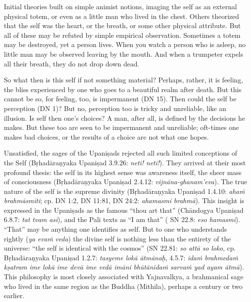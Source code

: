 \documentclass[12pt,openany]{book}%
\begin{document}
Initial theories built on simple animist notions, imaging the self as an external physical totem, or even as a little man who lived in the chest. Others theorized that the self was the heart, or the breath, or some other physical attribute. But all of these may be refuted by simple empirical observation. Sometimes a totem may be destroyed, yet a person lives. When you watch a person who is asleep, no little man may be observed leaving by the mouth. And when a trumpeter expels all their breath, they do not drop down dead.

So what then is this self if not something material? Perhaps, rather, it is feeling, the bliss experienced by one who goes to a beautiful realm after death. But this cannot be so, for feeling, too, is impermanent (DN 15). Then could the self be perception (DN 1)? But no, perception too is tricky and unreliable, like an illusion. Is self then one’s choices? A man, after all, is defined by the decisions he makes. But these too are seen to be impermanent and unreliable; oft-times one makes bad choices, or the results of a choice are not what one hopes.

Unsatisfied, the sages of the \textsanskrit{Upaniṣads} rejected all such limited conceptions of the Self (\textsanskrit{Bṛhadāraṇyaka} \textsanskrit{Upaniṣad} 3.9.26: \textit{neti! neti!}). They arrived at their most profound thesis: the self in its highest sense was awareness itself, the sheer mass of consciousness (\textsanskrit{Bṛhadāraṇyaka} \textsanskrit{Upaniṣad} 2.4.12: \textit{\textsanskrit{vijnāna}-ghanam’eva}). The true nature of the self is the supreme divinity (\textsanskrit{Bṛhadāraṇyaka} \textsanskrit{Upaniṣad} 1.4.10: \textit{\textsanskrit{ahaṁ} \textsanskrit{brahmāsmīti}}; cp. DN 1:2, DN 11:81, DN 24:2: \textit{ahamasmi \textsanskrit{brahmā}}). This insight is expressed in the \textsanskrit{Upaniṣads} as the famous “thou art that” (\textsanskrit{Chāndogya} \textsanskrit{Upaniṣad} 6.8.7: \textit{tat tvam asi}), and the Pali texts as “I am that” ( SN 22.8: \textit{eso hamasmi}). “That” may be anything one identifies as self. But to one who understands rightly (\textit{ya \textsanskrit{evaṁ} veda}) the divine self is nothing less than the entirety of the universe: “the self is identical with the cosmos” (SN 22.81: \textit{so \textsanskrit{attā} so loko}, cp. \textsanskrit{Bṛhadāraṇyaka} \textsanskrit{Upaniṣad} 1.2.7: \textit{tasyeme \textsanskrit{lokā} \textsanskrit{ātmānaḥ}}, 4.5.7: \textit{\textsanskrit{idaṁ} \textsanskrit{brahmedaṁ} \textsanskrit{kṣatram} ime \textsanskrit{lokā} ime \textsanskrit{devā} ime \textsanskrit{vedā} \textsanskrit{imāni} \textsanskrit{bhūtānīdaṁ} \textsanskrit{sarvaṁ} yad ayam \textsanskrit{ātmā}}). This philosophy is most closely associated with Yajnavalkya, a brahmanical sage who lived in the same region as the Buddha (Mithila), perhaps a century or two earlier.
\end{document}
